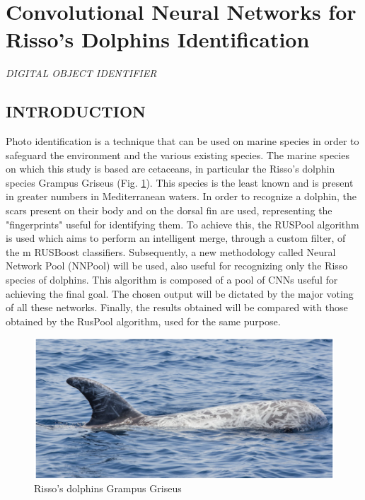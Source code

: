 \section{Convolutional Neural Networks for Risso’s Dolphins Identification}

\begin{center}
    \author{
    Rosalia Maglietta,
    Vito Renò,
    Rocco Cacioppoli,
    Emanuele Seller,
    Stefano Bellomo,
    Francesca Cornelia Santacesaria,
    Roberto Colella,
    Giulia Cipriano,
    Ettore Stella,
    Karin Hartman,
    Carmelo Fanizza,
    Giovanni Dimauro,
    \emph{(Member, IEEE)},
    Roberto Carlucci
    }
\end{center}

\begin{center}
    \emph{DIGITAL OBJECT IDENTIFIER}
\end{center}

\subsection{INTRODUCTION}
Photo identification is a technique that can be used on marine species in 
order to safeguard the environment and the various existing species. The 
marine species on which this study is based are cetaceans, in particular the 
Risso's dolphin species Grampus Griseus (Fig. \ref{fig:Risso}). This species is the least 
known and is present in greater numbers in Mediterranean waters. In order to 
recognize a dolphin, the scars present on their body and on the dorsal fin are 
used, representing the "fingerprints" useful for identifying them. To achieve 
this, the RUSPool algorithm is used which aims to perform an intelligent 
merge, through a custom filter, of the m RUSBoost classifiers. Subsequently, 
a new methodology called Neural Network Pool (NNPool) will be used, also 
useful for recognizing only the Risso species of dolphins. This algorithm is 
composed of a pool of CNNs useful for achieving the final goal. The chosen 
output will be dictated by the major voting of all these networks. Finally, 
the results obtained will be compared with those obtained by the RusPool 
algorithm, used for the same purpose.
\begin{figure}[h!]
    \centering
    \includegraphics[width = 0.8\linewidth]{images/paper10/Risso.png}
    \centering
    \caption{Risso’s dolphins Grampus Griseus}
    \label{fig:Risso}
\end{figure}